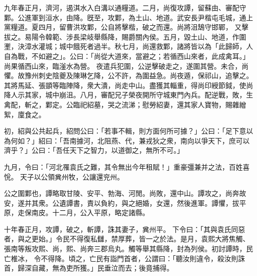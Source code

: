 \begin{pinyinscope}
九年春正月，濟河，遏淇水入白溝以通糧道。二月，尚復攻譚，留蘇由、審配守鄴。公進軍到洹水，由降。旣至，攻鄴，為土山、地道。武安長尹楷屯毛城，通上黨糧道。夏四月，留曹洪攻鄴，公自將擊楷，破之而還。尚將沮鵠守邯鄲，
又擊拔之。易陽令韓範、涉長梁岐舉縣降，賜爵關內侯。五月，毀土山、地道，作圍壍，決漳水灌城；城中餓死者過半。秋七月，尚還救鄴，諸將皆以為「此歸師，人自為戰，不如避之」。公曰：「尚從大道來，當避之；若循西山來者，此成禽耳。」尚果循西山來，臨滏水為營。
夜遣兵犯圍，公逆擊破走之，遂圍其營。未合，尚懼。故豫州刺史陰夔及陳琳乞降，公不許，為圍益急。尚夜遁，保祁山，追擊之。其將馬延、張顗等臨陣降，衆大潰，尚走中山。盡獲其輜重，得尚印綬節鉞，使尚降人示其家，城中崩沮。八月，審配兄子榮夜開所守城東門內兵。配逆戰，敗，生禽配，斬之，鄴定。公臨祀紹墓，哭之流涕；慰勞紹妻，還其家人寶物，賜雜繒絮，廩食之。


初，紹與公共起兵，紹問公曰：「若事不輯，則方面何所可據？」公曰：「足下意以為何如？」紹曰：「吾南據河，北阻燕、代，兼戎狄之衆，南向以爭天下，庶可以濟乎？」公曰：「吾任天下之智力，以道御之，無所不可。」


九月，令曰：「河北罹袁氏之難，其令無出今年租賦！」重豪彊兼并之法，百姓喜恱。
天子以公領兾州牧，公讓還兖州。


公之圍鄴也，譚略取甘陵、安平、勃海、河閒。尚敗，還中山。譚攻之，尚奔故安，遂并其衆。公遺譚書，責以負約，與之絕婚，女還，然後進軍。譚懼，拔平原，走保南皮。十二月，公入平原，略定諸縣。


十年春正月，攻譚，破之，斬譚，誅其妻子，兾州平。
下令曰：「其與袁氏同惡者，與之更始。」令民不得復私讎，禁厚葬，皆一之於法。是月，袁熙大將焦觸、張南等叛攻熙、尚，熙、尚奔三郡烏丸。觸等舉其縣降，封為列侯。初討譚時，民亡椎冰，
令不得降。頃之，亡民有詣門首者，公謂曰：「聽汝則違令，殺汝則誅首，歸深自藏，無為吏所獲。」民垂泣而去；後竟捕得。



\end{pinyinscope}
